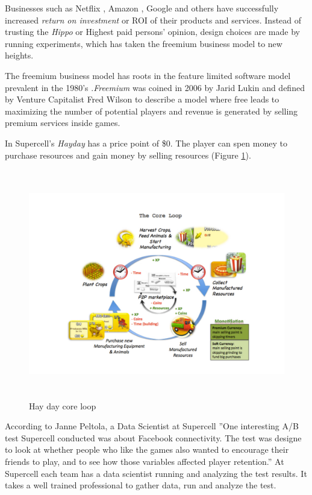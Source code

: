 \documentclass[english,12pt,a4paper,pdftex,elec,utf8]{aaltothesis}
\begin{document}
Businesses such as Netflix \cite{Liu2014}, Amazon \cite[p. 147]{Kohavi2009}, Google \cite{wired-abtesting} and others have successfully increased \textit{return on investment} or ROI of their products and services. Instead of trusting the \textit{Hippo} or Highest paid persons' opinion, design choices are made by running experiments, which has taken the freemium business model to new heights.

The freemium business model has roots in the feature limited software model prevalent in the 1980's \cite{Seufert2014}.\textit{Freemium} was coined in 2006 by Jarid Lukin and defined by Venture Capitalist Fred Wilson to describe a model where free leads to maximizing the number of potential players and revenue is generated by selling premium services inside games\cite{Wilson2006}.

In Supercell's \textit{Hayday} has a price point of \$0. The player can spen money to purchase resources and gain money by selling resources (Figure \ref{hayday-core}).

\begin{figure}[htb]
\centering \includegraphics[height=10cm]{diagrams/hayday_core}
\caption{Hay day core loop \cite{Katkoff2013}\label{hayday-core}}
\end{figure}

According to Janne Peltola, a Data Scientist at Supercell ''One interesting A/B test Supercell conducted was about Facebook connectivity. The test was designe to look at whether people who like the games also wanted to encourage their friends to play, and to see how those variables affected player retention.'' At Supercell each team has a data scientist running and analyzing the test results. It takes a well trained professional to gather data, run and analyze the test.\cite{hp-vertica}
\end{document}
